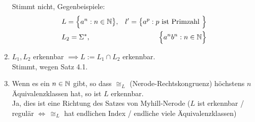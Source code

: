 \begin{enumerate}[label=\alph*)]
	Stimmt nicht, Gegenbeispiele:
	\begin{align*}
		&L=\Big\lbrace a^n:n\in\mathbb{N}\big\rbrace,& l'=\big\lbrace a^p:p\text{ ist Primzahl }\Big\rbrace\\
		&L_2=\Sigma^\ast, &\Big\lbrace a^n b^n:n\in\mathbb{N}\Big\rbrace
	\end{align*}
	\item $L_1,L_2$ erkennbar $\implies L:=L_1\cap L_2$ erkennbar.\\
	Stimmt, wegen Satz 4.1.
	\item Wenn es ein $n\in\mathbb{N}$ gibt, so dass $\cong_L$ (Nerode-Rechtskongruenz) höchstens $n$ Äquivalenzklassen hat, so ist $L$ erkennbar.\\
	Ja, dies ist eine Richtung des Satzes von Myhill-Nerode
	($L$ ist erkennbar / regulär $\Longleftrightarrow \, \cong_L$ hat endlichen Index / endliche viele Äquivalenzklassen)
\end{enumerate}

